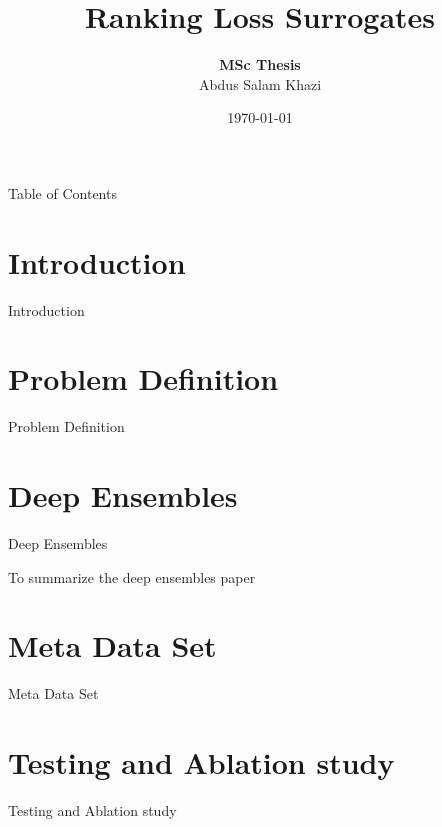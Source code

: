 \documentclass{beamer}
\title[Ranking Loss Surrogates]{Ranking Loss Surrogates}
\author[Abdus Salam Khazi]
{
    \textbf{MSc Thesis}\\
    Abdus Salam Khazi
}
\institute{Supervisors: \\
            \begin{tabular}{ll}
		    	JProf. Josif Grabocka \& Sebastian Pineda
		    \end{tabular}
}
\date{\today}
\begin{document}
\begin{frame}
\titlepage
\end{frame}

\begin{frame}{Table of Contents}
\tableofcontents
\end{frame}

\section{Introduction}

\begin{frame}[t]{Introduction}

\end{frame}

\section{Problem Definition}

\begin{frame}[t]{Problem Definition}

\end{frame}

\section{Deep Ensembles}

\begin{frame}[t]{Deep Ensembles}

To summarize the deep ensembles paper \cite{DeepEnsemblesPaper}

\end{frame}

\section{Meta Data Set}

\begin{frame}[t]{Meta Data Set}

\end{frame}


\section{Testing and Ablation study}

\begin{frame}[t]{Testing and Ablation study}

\end{frame}
\end{document}
